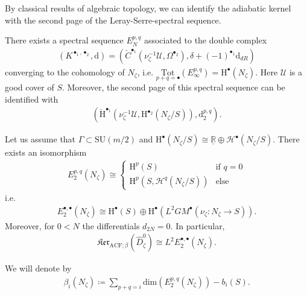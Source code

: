 \documentclass[psamsfonts]{amsart}
\theoremstyle{plain}
\theoremstyle{definition}{
\newtheorem{defi}{Definition}[section]
\newtheorem{ass}{Assumption}
\newtheorem*{nota}{Notation}}
\theoremstyle{remark}{
\newtheorem{rem}{Remark}
\newtheorem{ex}{Example}}
\theoremstyle{plain}{
\newtheorem{thm}{Theorem}[section]
\newtheorem{lem}{Lemma}[section]
\newtheorem{cor}{Corollary}[section]
\newtheorem{prop}{Proposition}[section]
\newtheorem{con}{Conjecture}[section]}
\newcommand{\m}[1]{{\mathrm{#1}}}
\newcommand{\tot}[3]{\underset{#1}{\m{Tot}^{#2}}\left(#3\right)}
\begin{document}
By classical results of algebraic topology, we can identify the adiabatic kernel with the second page of the Leray-Serre-spectral sequence. 

\begin{thm}
There exists a spectral sequence $E^{p,q}_N$ associated to the double complex
\begin{align*}
    (K^{\bullet_1,\bullet_2},\m{d})=(\check{C}^{\bullet_1}(\nu_\zeta^{-1}\mathcal{U},\Omega^{\bullet_2}),\delta+(-1)^{\bullet_1}\m{d}_{dR})
\end{align*}
converging to the cohomology of $N_\zeta$, i.e. $\tot{p+q=\bullet}{}{E^{p,q}_\infty}=\m{H}^\bullet(N_\zeta)$. Here $\mathcal{U}$ is a good cover of $S$. Moreover, the second page of this spectral sequence can be identified with 
\begin{align*}
    (\check{\m{H}}^{\bullet_1}(\nu_\zeta^{-1}\mathcal{U},\m{H}^{\bullet_2}(N_\zeta/S)),\m{d}^{p,q}_2).
\end{align*}
\end{thm}




\begin{prop}
\label{L2E2}
Let us assume that $\Gamma\subset\m{SU}(m/2)$ and  $\m{H}^\bullet(N_\zeta/S)\cong\underline{\mathbb{R}}\oplus\mathcal{H}^\bullet(N_\zeta/S)$. There exists an isomorphism 
\begin{align*}
    E^{p,q}_2(N_\zeta)\cong\left\{\begin{array}{ll}
         \m{H}^p(S)&\text{if } q=0 \\
         \m{H}^p(S,\mathcal{H}^q(N_\zeta/S))&\text{else}
    \end{array}\right.
\end{align*}
i.e. 
\begin{align*}
     E^{\bullet,\bullet}_2(N_\zeta)\cong\m{H}^\bullet(S)\oplus\m{H}^\bullet(L^2GM^\bullet(\nu_\zeta\colon N_\zeta\rightarrow S)).
\end{align*}
Moreover, for $0<N$ the differentials $d_{2N}=0$. In particular,
    \begin{align*}
        \mathfrak{Ker}_{\m{ACF};\beta}(\widehat{D}^0_\zeta)\cong L^2E^{\bullet,\bullet}_2(N_\zeta).
    \end{align*}
\end{prop}

\begin{nota}
    We will denote by 
    \begin{align*}
\beta_i(N_\zeta)\coloneqq \sum_{p+q=i}\m{dim}(E^{p,q}_2(N_\zeta))-b_i(S).
    \end{align*}    
\end{nota}
\end{document}
